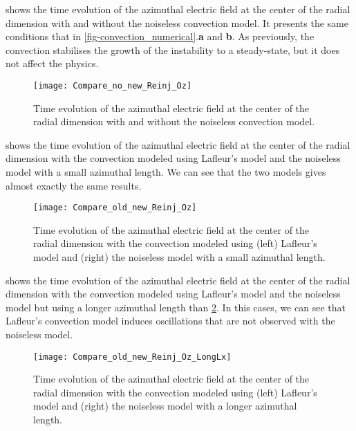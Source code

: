        shows the time  evolution of the azimuthal electric field at the center of the radial dimension with and without the noiseless convection model.
      It presents the same conditions that in \cref{fig-convection_numerical}.{\bf a} and {\bf b}. 
      As previously, the convection stabilises the growth of the instability to a steady-state, but it does not affect the physics.
       
      
      \begin{figure}[hbtp]
        \centering
        \texttt{[image: Compare\_no\_new\_Reinj\_Oz]}
        \caption{Time evolution of the azimuthal electric field at the center of the radial dimension with and without the noiseless convection model. }
        \label{fig-newconv_noconv}
      \end{figure}
      
       shows the  time  evolution of the azimuthal electric field at the center of the radial dimension  with the convection modeled using Lafleur's model and the noiseless model with a small azimuthal length.
      We can see that the two models gives almost exactly the same results.
      
      \begin{figure}[hbtp]
        \centering
        \texttt{[image: Compare\_old\_new\_Reinj\_Oz]}
        \caption{Time evolution of the azimuthal electric field at the center of the radial dimension with the convection modeled using (left) Lafleur's model and (right) the noiseless model with a small azimuthal length.}
        \label{fig-oldeconv_newconv}
      \end{figure}
      
      
       shows the  time  evolution of the azimuthal electric field at the center of the radial dimension  with the convection modeled using Lafleur's model and the noiseless model but using a longer azimuthal length than \cref{fig-oldeconv_newconv}.
      In this cases, we can see that Lafleur's convection model induces oscillations that are not observed with the noiseless model.
      
      \begin{figure}[hbtp]
        \centering
        \texttt{[image: Compare\_old\_new\_Reinj\_Oz\_LongLx]}
        \caption{Time evolution of the azimuthal electric field at the center of the radial dimension with the convection modeled using (left) Lafleur's model and (right) the noiseless model with a longer azimuthal length.}
        \label{fig-oldeconv_newconv_longLZ}
      \end{figure}
      


